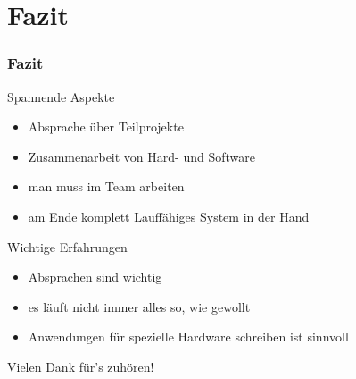 \documentclass[11pt]{beamer}
\begin{document}
	\section{Fazit}
	\begin{frame}
		\frametitle{Fazit}
		\centering
		\begin{block}{Spannende Aspekte}
			\begin{itemize}
				\item Absprache \"uber Teilprojekte
				\item Zusammenarbeit von Hard- und Software
				\item man muss im Team arbeiten
				\item am Ende komplett Lauff\"ahiges System in der Hand
			\end{itemize}
		\end{block}
		\pause
		\begin{block}{Wichtige Erfahrungen}
			\begin{itemize}
				\item Absprachen sind wichtig
				\item es l\"auft nicht immer alles so, wie gewollt
				\item Anwendungen f\"ur spezielle Hardware schreiben ist sinnvoll
			\end{itemize}
		\end{block}
	\end{frame}
	\begin{frame}
		\huge
		\begin{center}
			\vfill
			Vielen Dank für's zuhören!
			\vfill
		\end{center}
	\end{frame}
\end{document}

